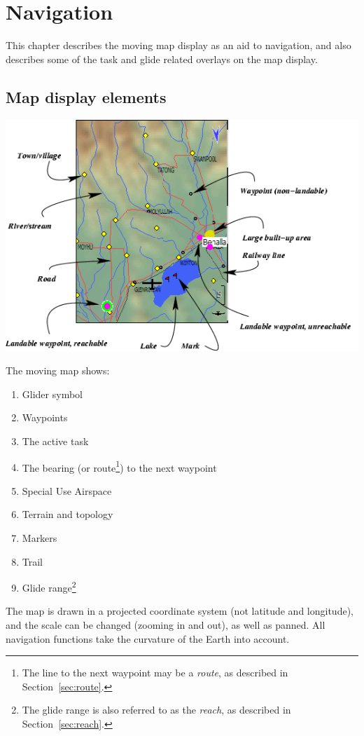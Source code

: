 \chapter{Navigation}\label{cha:navigation}
This chapter describes the moving map display as an aid to navigation,
and also describes some of the task and glide related overlays on the
map display.

\section{Map display elements}

\begin{maxipage}
\includegraphics[angle=0,width=0.9\linewidth,keepaspectratio='true']{figures/fig-map.png}
\end{maxipage}

The moving map shows:
\begin{enumerate} 
\item Glider symbol
\item Waypoints
\item The active task
\item The bearing (or route\footnote{The line to the next waypoint may be a {\em route}, as described in Section~\ref{sec:route}.})
  to the next waypoint
\item Special Use Airspace
\item Terrain and topology
\item Markers
\item Trail
\item Glide range\footnote{The glide range is also referred to as the {\em reach}, as described in Section~\ref{sec:reach}.}
\end{enumerate}
The map is drawn in a projected coordinate system (not latitude and
longitude), and the scale can be changed (zooming in and out), as well
as panned.  All navigation functions take the curvature of the Earth
into account.

